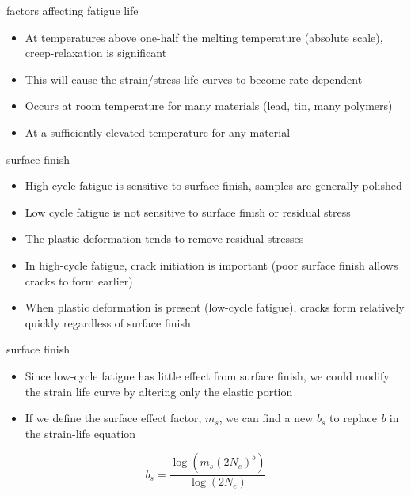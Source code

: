 \documentclass[
  letterpaper,
  ignorenonframetext,
  aspectratio=43,
  handout,
  12pt]{beamer}
\providecommand{\tightlist}{%
  \setlength{\itemsep}{0pt}\setlength{\parskip}{0pt}}
\providecommand{\tightlist}{%
\setlength{\itemsep}{0pt}\setlength{\parskip}{0pt}}
\begin{document}
\begin{frame}{factors affecting fatigue life}
\protect\hypertarget{factors-affecting-fatigue-life}{}
\begin{itemize}
\tightlist
\item
  At temperatures above one-half the melting temperature (absolute
  scale), creep-relaxation is significant
\item
  This will cause the strain/stress-life curves to become rate dependent
\item
  Occurs at room temperature for many materials (lead, tin, many
  polymers)
\item
  At a sufficiently elevated temperature for any material
\end{itemize}
\end{frame}

\begin{frame}{surface finish}
\protect\hypertarget{surface-finish}{}
\begin{itemize}
\tightlist
\item
  High cycle fatigue is sensitive to surface finish, samples are
  generally polished
\item
  Low cycle fatigue is not sensitive to surface finish or residual
  stress
\item
  The plastic deformation tends to remove residual stresses
\item
  In high-cycle fatigue, crack initiation is important (poor surface
  finish allows cracks to form earlier)
\item
  When plastic deformation is present (low-cycle fatigue), cracks form
  relatively quickly regardless of surface finish
\end{itemize}
\end{frame}

\begin{frame}{surface finish}
\protect\hypertarget{surface-finish-1}{}
\begin{itemize}
\tightlist
\item
  Since low-cycle fatigue has little effect from surface finish, we
  could modify the strain life curve by altering only the elastic
  portion
\item
  If we define the surface effect factor, \(m_s\), we can find a new
  \(b_s\) to replace \emph{b} in the strain-life equation
\end{itemize}

\[b_s = \frac{\log\left(m_s (2N_e)^b\right)}{\log(2N_e)}\]
\end{frame}
\end{document}
